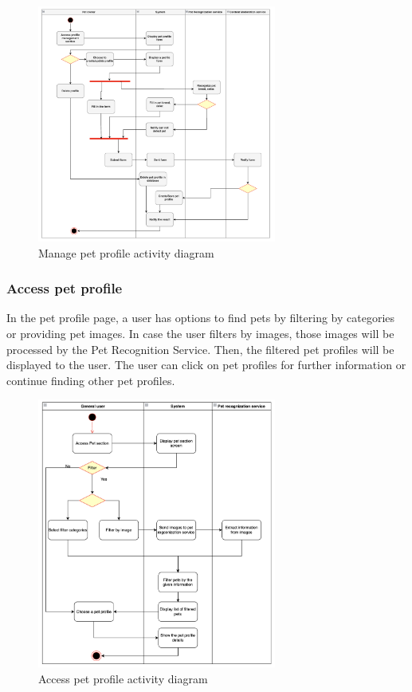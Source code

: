 \begin{figure}[H]
  \centering
  \includegraphics[width=0.7\textwidth]{Figures/manage_pet.png}
  \caption{Manage pet profile activity diagram}
  \label{fig:manage-pet}
\end{figure}

\subsubsection{Access pet profile}

In the pet profile page, a user has options to find pets by filtering by categories or providing pet images. In case the user filters by images, those images will be processed by the Pet Recognition Service. Then, the filtered pet profiles will be displayed to the user. The user can click on pet profiles for further information or continue finding other pet profiles.

\begin{figure}[H]
  \centering
  \includegraphics[width=0.7\textwidth]{Figures/access_pet.png}
  \caption{Access pet profile activity diagram}
  \label{fig:access-pet}
\end{figure}

